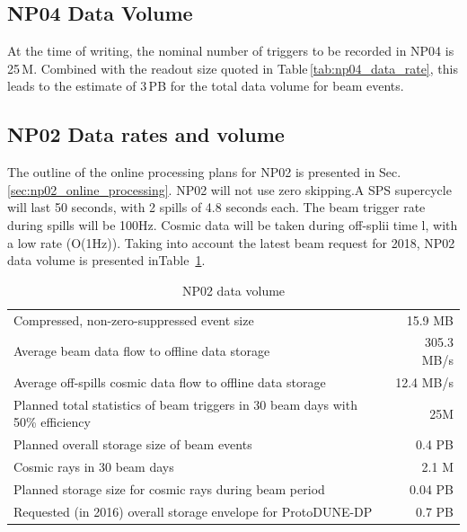 \documentclass[12pt]{article}
\begin{document}
{\subsection{NP04 Data Volume}

At the time of writing, the nominal number of triggers to be recorded in NP04 is 25\,M.
Combined with the readout size quoted in Table\,\ref{tab:np04_data_rate}, this leads to
the estimate of 3\,PB for the total data volume for beam events.

\subsection{NP02 Data rates and  volume}
\label{sec:np02_data_rate}
The outline of the online processing plans for NP02 is presented in Sec.\,\ref{sec:np02_online_processing}.
NP02 will not use zero skipping.A SPS supercycle will last 50 seconds, with 2 spills of 4.8 seconds each.
The beam trigger rate during spills will be 100Hz. Cosmic data will be taken during off-splii time l, with a low rate (O(1Hz)).
Taking into account the  latest beam request for 2018,  NP02 data volume  is   presented  inTable~\ref{tab:np02_data_rate}.

\begin{table}[htbp]
  \centering
  \begin{tabular}[h]{l|r}
\hline
     Compressed, non-zero-suppressed event size & 15.9 MB\\
    Average beam data flow to offline data storage &   305.3 MB/s  \\
    Average off-spills cosmic data flow to offline data storage &   12.4 MB/s\\
    Planned total statistics of beam triggers in 30 beam days with 50\% efficiency&25M\\
    Planned overall storage size of beam events&   0.4 PB\\
   Cosmic rays in 30  beam days&  2.1  M\\
   Planned storage size for cosmic rays during beam period&  0.04 PB\\
   Requested (in 2016) overall storage envelope for ProtoDUNE-DP&0.7 PB \\
    \hline
  \end{tabular}
 \caption{NP02 data volume}
  \label{tab:np02_data_rate}
\end{table}

}
\end{document}
